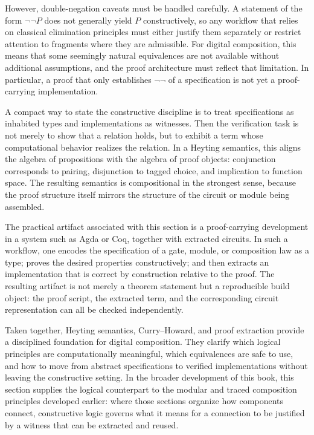 \documentclass[11pt]{article}
\begin{document}
However, double-negation caveats must be handled carefully. A statement of the form \(\neg\neg P\) does not generally yield \(P\) constructively, so any workflow that relies on classical elimination principles must either justify them separately or restrict attention to fragments where they are admissible. For digital composition, this means that some seemingly natural equivalences are not available without additional assumptions, and the proof architecture must reflect that limitation. In particular, a proof that only establishes \(\neg\neg\) of a specification is not yet a proof-carrying implementation.

A compact way to state the constructive discipline is to treat specifications as inhabited types and implementations as witnesses. Then the verification task is not merely to show that a relation holds, but to exhibit a term whose computational behavior realizes the relation. In a Heyting semantics, this aligns the algebra of propositions with the algebra of proof objects: conjunction corresponds to pairing, disjunction to tagged choice, and implication to function space. The resulting semantics is compositional in the strongest sense, because the proof structure itself mirrors the structure of the circuit or module being assembled.

The practical artifact associated with this section is a proof-carrying development in a system such as Agda or Coq, together with extracted circuits. In such a workflow, one encodes the specification of a gate, module, or composition law as a type; proves the desired properties constructively; and then extracts an implementation that is correct by construction relative to the proof. The resulting artifact is not merely a theorem statement but a reproducible build object: the proof script, the extracted term, and the corresponding circuit representation can all be checked independently.

Taken together, Heyting semantics, Curry--Howard, and proof extraction provide a disciplined foundation for digital composition. They clarify which logical principles are computationally meaningful, which equivalences are safe to use, and how to move from abstract specifications to verified implementations without leaving the constructive setting. In the broader development of this book, this section supplies the logical counterpart to the modular and traced composition principles developed earlier: where those sections organize how components connect, constructive logic governs what it means for a connection to be justified by a witness that can be extracted and reused.
\end{document}
